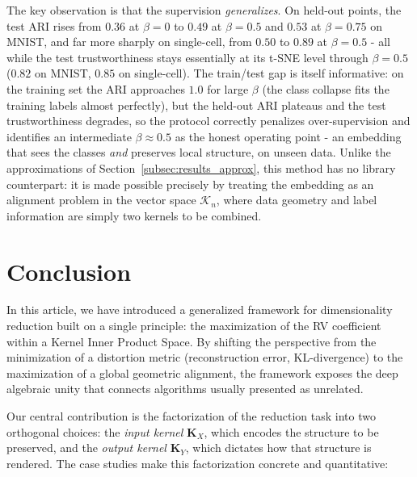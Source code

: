 \documentclass[11pt]{article}
\begin{document}
	The key observation is that the supervision \emph{generalizes}. On held-out
	points, the test ARI rises from $0.36$ at $\beta=0$ to $0.49$ at $\beta=0.5$ and
	$0.53$ at $\beta=0.75$ on MNIST, and far more sharply on single-cell, from
	$0.50$ to $0.89$ at $\beta=0.5$ - all while the test trustworthiness stays
	essentially at its t-SNE level through $\beta=0.5$ ($0.82$ on MNIST, $0.85$ on
	single-cell). The train/test gap is itself informative: on the training set the
	ARI approaches $1.0$ for large $\beta$ (the class collapse fits the training
	labels almost perfectly), but the held-out ARI plateaus and the test
	trustworthiness degrades, so the protocol correctly penalizes over-supervision
	and identifies an intermediate $\beta\approx0.5$ as the honest operating point -
	an embedding that sees the classes \emph{and} preserves local structure, on
	unseen data. Unlike the approximations of Section~\ref{subsec:results_approx},
	this method has no library counterpart: it is made possible precisely by treating
	the embedding as an alignment problem in the vector space $\mathcal{K}_n$, where
	data geometry and label information are simply two kernels to be combined.
	
	
	\section{Conclusion}
	\label{section:conclusion}
	
	In this article, we have introduced a generalized framework for dimensionality reduction built on a single principle: the maximization of the RV coefficient within a Kernel Inner Product Space. By shifting the perspective from the minimization of a distortion metric (reconstruction error, KL-divergence) to the maximization of a global geometric alignment, the framework exposes the deep algebraic unity that connects algorithms usually presented as unrelated.
	
	Our central contribution is the factorization of the reduction task into two orthogonal choices: the \emph{input kernel} $\mathbf{K}_X$, which encodes the structure to be preserved, and the \emph{output kernel} $\mathbf{K}_Y$, which dictates how that structure is rendered. The case studies make this factorization concrete and quantitative:
	
\end{document}

